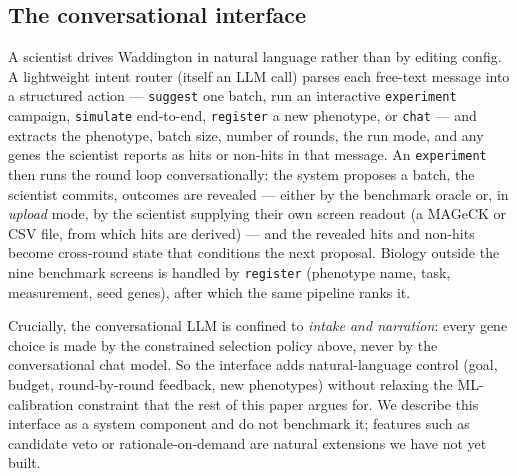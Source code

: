 \documentclass[11pt]{article}
\begin{document}
\subsection*{The conversational interface}

A scientist drives Waddington in natural language rather than by editing config. A lightweight intent
router (itself an LLM call) parses each free-text message into a structured action --- \texttt{suggest}
one batch, run an interactive \texttt{experiment} campaign, \texttt{simulate} end-to-end,
\texttt{register} a new phenotype, or \texttt{chat} --- and extracts the phenotype, batch size, number of
rounds, the run mode, and any genes the scientist reports as hits or non-hits in that message. An
\texttt{experiment} then runs the round loop conversationally: the system proposes a batch, the scientist
commits, outcomes are revealed --- either by the benchmark oracle or, in \emph{upload} mode, by the
scientist supplying their own screen readout (a MAGeCK or CSV file, from which hits are derived) --- and
the revealed hits and non-hits become cross-round state that conditions the next proposal. Biology outside
the nine benchmark screens is handled by \texttt{register} (phenotype name, task, measurement, seed
genes), after which the same pipeline ranks it.

Crucially, the conversational LLM is confined to \emph{intake and narration}: every gene choice is made
by the constrained selection policy above, never by the conversational chat model. So the interface adds
natural-language control (goal, budget, round-by-round feedback, new phenotypes) without relaxing the
ML-calibration constraint that the rest of this paper argues for. We describe this interface as a system
component and do not benchmark it; features such as candidate veto or rationale-on-demand are natural
extensions we have not yet built.
\end{document}
